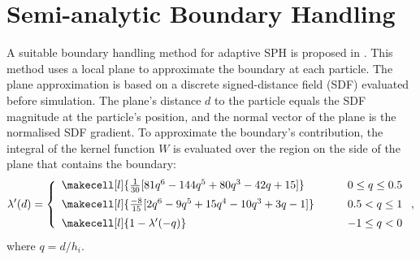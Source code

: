 \documentclass[VANCOUVER,STIX1COL]{WileyNJD-v2}
\begin{document}
\section{Semi-analytic Boundary Handling}
\label{sec:boundary}

A suitable boundary handling method for adaptive SPH is proposed in \cite{Winchenbach20}. This method uses a local plane to approximate the boundary at each particle. The plane approximation is based on a discrete signed-distance field (SDF) evaluated before simulation. The plane's distance $d$ to the particle equals the SDF magnitude at the particle's position, and the normal vector of the plane is the normalised SDF gradient. To approximate the boundary's contribution, the integral of the kernel function $W$ is evaluated over the region on the side of the plane that contains the boundary:
\begin{equation}
    \lambda'(d) = \left\{
    \begin{array}{ll}
        \vspace{5pt}
        \makecell[l]{\frac{1}{30}[81q^6 - 144q^5+ 80q^3 -42q + 15]} & \hspace{2em} 0 \leq q \leq 0.5\\
        \vspace{5pt}
        \makecell[l]{\frac{-8}{15}[2q^6 - 9q^5 + 15q^4 - 10q^3 + 3q - 1]} & \hspace{2em} 0.5 < q \leq 1 \\
        \makecell[l]{1-\lambda'(-q)} & \hspace{2em} -1 \leq q < 0 
    \end{array}
    \right.,
\end{equation}
where $q = d / h_i$.
\end{document}
